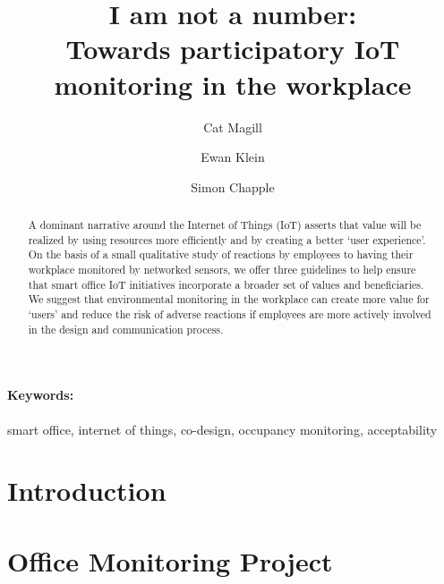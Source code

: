 \documentclass[10pt,twocolumn]{article}
\begin{document}
\title{\vspace{-1cm}\bfseries\LARGE  I am not a number:\\
Towards participatory IoT monitoring in the workplace}

\author[*]{Cat Magill}
\author[*]{Ewan Klein}
\author[$\dagger$]{Simon Chapple}
\date{}

\maketitle


\paragraph{Keywords:} smart office, internet of things, co-design,
occupancy monitoring, acceptability

\begin{abstract}
\noindent
  A dominant narrative around the Internet of Things (IoT) asserts
  that value will be realized by using resources more efficiently and
  by creating a better ‘user experience’.  On the basis of a small
  qualitative study of reactions by employees to having their
  workplace monitored by networked sensors, we offer three guidelines
  to help ensure that smart office IoT initiatives incorporate a
  broader set of values and beneficiaries.  We suggest that
  environmental monitoring in the workplace can create more value for
  `users' and reduce the risk of adverse reactions if employees are
  more actively involved in the design and communication process.
\end{abstract}


\section{Introduction}
\label{sec:introduction}



\section{Office Monitoring Project}
\label{sec:pilot}


\end{document}
